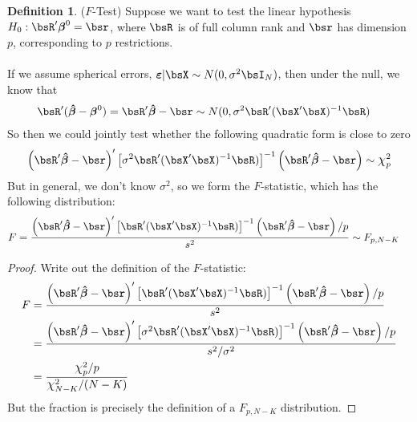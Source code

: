 \documentclass[12pt]{article}
\theoremstyle{plain}
\theoremstyle{definition}
\newtheorem{defn}[thm]{Definition}
\theoremstyle{remark}
\newcommand*{\Chi}{\mbox{\large$\chi$}} %
\newcommand{\bsvarepsilon}{\boldsymbol{\varepsilon}}
\newcommand{\bsbeta}{\boldsymbol{\beta}}
\newcommand{\bshatbeta}{\boldsymbol{\hat{\beta}}}
\begin{document}
\begin{defn}($F$-Test)
Suppose we want to test the linear hypothesis
$H_0: \bsR'\bsbeta^0 = \bsr$,
where $\bsR$ is of full column rank and $\bsr$ has dimension $p$,
corresponding to $p$ restrictions.
\\
\\
If we assume spherical errors,
$\bsvarepsilon|\bsX\sim N(0,\sigma^2\bsI_N)$, then under the null, we
know that
\begin{align*}
  \bsR'(\bshatbeta-\bsbeta^0)
  =
  \bsR'\bshatbeta-\bsr
  &\sim N(0,\sigma^2 \bsR'(\bsX'\bsX)^{-1}\bsR)
\end{align*}
So then we could jointly test whether the following quadratic form is
close to zero
\begin{align*}
  \left(\bsR'\bshatbeta-\bsr\right)'
  \left[\sigma^2 \bsR'(\bsX'\bsX)^{-1}\bsR)\right]^{-1}
  \left(\bsR'\bshatbeta-\bsr\right)
  \sim \Chi_p^2
\end{align*}
But in general, we don't know $\sigma^2$, so we form the $F$-statistic,
which has the following distribution:
\begin{align*}
  F &=
  \frac{%
  \left(\bsR'\bshatbeta-\bsr\right)'
  \left[\bsR'(\bsX'\bsX)^{-1}\bsR)\right]^{-1}
  \left(\bsR'\bshatbeta-\bsr\right)/p
  }{s^2}
  \sim F_{p,N-K}
\end{align*}
\end{defn}

\begin{proof}
Write out the definition of the $F$-statistic:
\begin{align*}
  F &=
  \frac{%
  \left(\bsR'\bshatbeta-\bsr\right)'
  \left[\bsR'(\bsX'\bsX)^{-1}\bsR)\right]^{-1}
  \left(\bsR'\bshatbeta-\bsr\right)/p
  }{s^2} \\
  &=
  \frac{%
  \left(\bsR'\bshatbeta-\bsr\right)'
  \left[\sigma^2\bsR'(\bsX'\bsX)^{-1}\bsR)\right]^{-1}
  \left(\bsR'\bshatbeta-\bsr\right)/p
  }{s^2/\sigma^2} \\
  &=
  \frac{%
    \Chi^2_p/p
  }{\Chi^2_{N-K}/(N-K)}
\end{align*}
But the fraction is precisely the definition of a $F_{p,N-K}$ distribution.
\end{proof}
\end{document}
